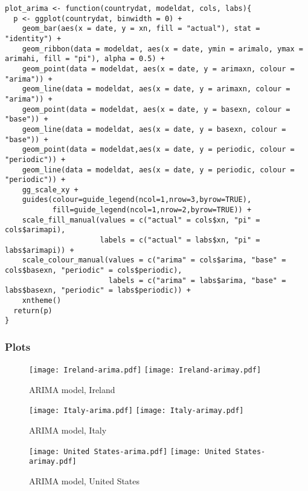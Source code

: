 \begin{lstlisting}[frame=single, caption = {Plot ARIMA Model}]
plot_arima <- function(countrydat, modeldat, cols, labs){
  p <- ggplot(countrydat, binwidth = 0) + 
    geom_bar(aes(x = date, y = xn, fill = "actual"), stat = "identity") + 
    geom_ribbon(data = modeldat, aes(x = date, ymin = arimalo, ymax = arimahi, fill = "pi"), alpha = 0.5) +
    geom_point(data = modeldat, aes(x = date, y = arimaxn, colour = "arima")) + 
    geom_line(data = modeldat, aes(x = date, y = arimaxn, colour = "arima")) +
    geom_point(data = modeldat, aes(x = date, y = basexn, colour = "base")) + 
    geom_line(data = modeldat, aes(x = date, y = basexn, colour = "base")) +
    geom_point(data = modeldat,aes(x = date, y = periodic, colour = "periodic")) +
    geom_line(data = modeldat, aes(x = date, y = periodic, colour = "periodic")) +
    gg_scale_xy + 
    guides(colour=guide_legend(ncol=1,nrow=3,byrow=TRUE),
           fill=guide_legend(ncol=1,nrow=2,byrow=TRUE)) +
    scale_fill_manual(values = c("actual" = cols$xn, "pi" = cols$arimapi), 
                      labels = c("actual" = labs$xn, "pi" = labs$arimapi)) +
    scale_colour_manual(values = c("arima" = cols$arima, "base" = cols$basexn, "periodic" = cols$periodic), 
                        labels = c("arima" = labs$arima, "base" = labs$basexn, "periodic" = labs$periodic)) +
    xntheme()
  return(p)
}
\end{lstlisting}

\subsubsection{Plots}

\begin{figure}[H]
  \texttt{[image: Ireland-arima.pdf]} \label{fig:ireland-arima}
\endminipage\hfill
{}
  \texttt{[image: Ireland-arimay.pdf]} \label{fig:ireland-arimay}
\endminipage
\caption{ARIMA model, Ireland}
\end{figure}

\begin{figure}[H]
  \texttt{[image: Italy-arima.pdf]} \label{fig:italy-arima}
\endminipage\hfill
{}
  \texttt{[image: Italy-arimay.pdf]} \label{fig:italy-arimay}
\endminipage
\caption{ARIMA model, Italy}
\end{figure}

\begin{figure}[H]
  \texttt{[image: United States-arima.pdf]} \label{fig:usa-arima}
\endminipage\hfill
{}
  \texttt{[image: United States-arimay.pdf]} \label{fig:usa-arimay}
\endminipage
\caption{ARIMA model, United States}
\end{figure}


